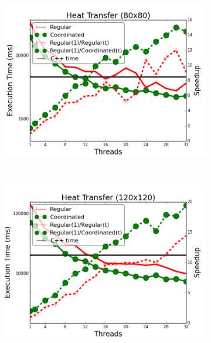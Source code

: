 \begin{figure}[]
        \centering
        \begin{subfigure}[b]{\plotsize\textwidth}
           \includegraphics[width=\textwidth]{experiments/coordination/cmpnew-new-heat-transfer-80.png}
           \label{fig:coordination:coord_ht_80}
        \end{subfigure}
        ~
        \begin{subfigure}[b]{\plotsize\textwidth}
           \includegraphics[width=\textwidth]{experiments/coordination/cmpnew-new-heat-transfer-120.png}
           \label{fig:coordination:coord_ht_120}
        \end{subfigure} \\
        \label{fig:coordination:results_ht_new}
\end{figure}
